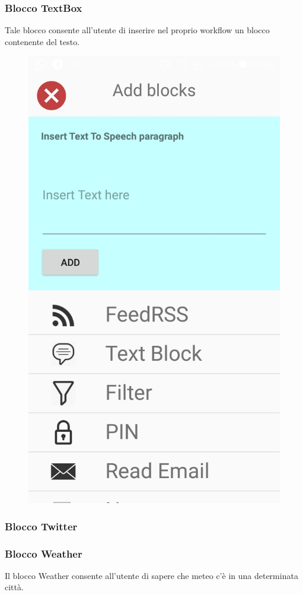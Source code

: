 \subsubsection{Blocco TextBox}
Tale blocco consente all'utente di inserire nel proprio workflow un blocco contenente del testo.

\begin{figure}[!ht]
\centering
\includegraphics[scale=0.2]{images/BlockTextToSpeech}
\caption{}
\end{figure}

\subsubsection{Blocco Twitter}


\subsubsection{Blocco Weather}
Il blocco Weather consente all'utente di sapere che meteo c'è in una determinata città.
